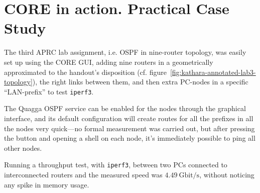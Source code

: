 \section{CORE in action. Practical Case Study}
\label{sec:corepracticalcasestudy}

The third APRC lab assignment, i.e. OSPF in nine-router topology, was easily set up using the CORE GUI, adding nine routers in a geometrically approximated to the handout's disposition (cf. figure~\ref{fig:kathara-annotated-lab3-topology}), the right links between them, and then extra PC-nodes in a specific ``LAN-prefix'' to test \texttt{iperf3}.



The Quagga OSPF service can be enabled for the nodes through the graphical interface, and its default configuration will create routes for all the prefixes in all the nodes very quick---no formal measurement was carried out, but after pressing the button and opening a shell on each node, it's immediately possible to ping all other nodes.

Running a throughput test, with \texttt{iperf3}, between two PCs connected to interconnected routers and the measured speed was $4.49~\mbox{Gbit/s}$, without noticing any spike in memory usage.

